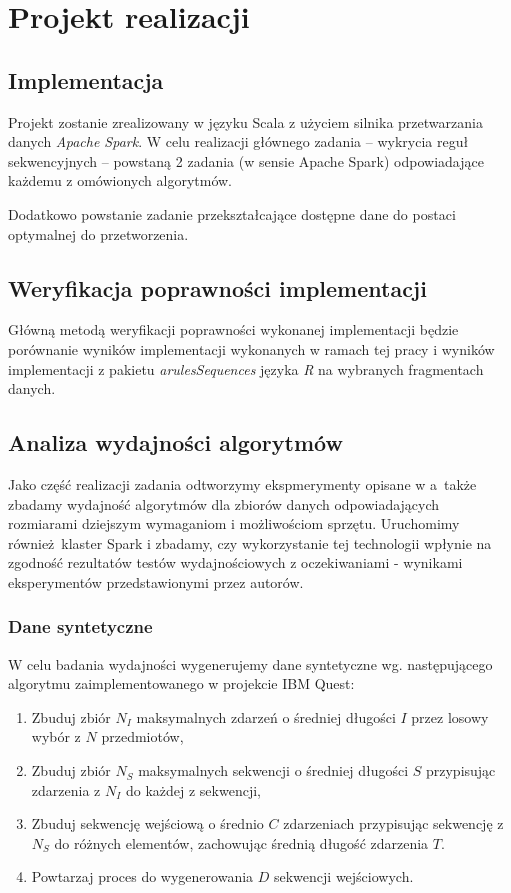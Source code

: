 \documentclass[paper=a4, fontsize=11pt]{scrartcl} %
\numberwithin{equation}{section} %
\numberwithin{figure}{section} %
\numberwithin{table}{section} %
\begin{document}
\section{Projekt realizacji}
\subsection{Implementacja}
Projekt zostanie zrealizowany w języku Scala z użyciem silnika przetwarzania danych \emph{Apache Spark}.
W celu realizacji głównego zadania -- wykrycia reguł sekwencyjnych -- powstaną 2 zadania (w sensie Apache Spark) odpowiadające każdemu z omówionych algorytmów.

Dodatkowo powstanie zadanie przekształcające dostępne dane do postaci optymalnej do przetworzenia.

\subsection{Weryfikacja poprawności implementacji}
Główną metodą weryfikacji poprawności wykonanej implementacji będzie porównanie wyników implementacji wykonanych w ramach tej pracy i wyników implementacji z pakietu \emph{arulesSequences} języka \emph{R} na wybranych fragmentach danych.

\subsection{Analiza wydajności algorytmów}
Jako część realizacji zadania odtworzymy ekspmerymenty opisane w \cite{spade}
a~także zbadamy wydajność algorytmów dla zbiorów danych odpowiadających rozmiarami
dziejszym wymaganiom i możliwościom sprzętu.  Uruchomimy również klaster Spark
i zbadamy, czy wykorzystanie tej technologii wpłynie na zgodność rezultatów
testów wydajnościowych z oczekiwaniami - wynikami eksperymentów przedstawionymi
przez autorów.

\subsubsection{Dane syntetyczne}
W celu badania wydajności wygenerujemy dane syntetyczne wg. następującego
algorytmu zaimplementowanego w projekcie IBM Quest:
\begin{enumerate}
    \item Zbuduj zbiór \( N_I \) maksymalnych zdarzeń o średniej długości \( I \)
          przez losowy wybór z \( N \) przedmiotów,
    \item Zbuduj zbiór \( N_S \) maksymalnych sekwencji o średniej długości \( S \)
          przypisując zdarzenia z \( N_I \) do każdej z sekwencji,
    \item Zbuduj sekwencję wejściową o średnio \( C \) zdarzeniach przypisując
          sekwencję z \( N_S \) do różnych elementów, zachowując średnią długość
          zdarzenia \( T \).
    \item Powtarzaj proces do wygenerowania \( D \) sekwencji wejściowych.
\end{enumerate}
\end{document}
